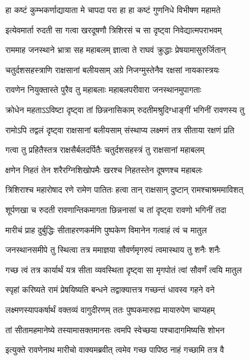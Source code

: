 \twolineshloka
{हा कष्टं कुम्भकर्णाद्यायाता मे चापदा परा}
{हा हा कष्टं गुणनिधे विभीषण महामते} %

\twolineshloka
{इत्येवमार्ता रुदती सा गत्वा खरदूषणौ}
{त्रिशिरसं च सा दृष्ट्वा निवेद्यात्मपराभवम्} %

\twolineshloka
{राममाह जनस्थाने भ्रात्रा सह महाबलम्}
{ज्ञात्वा ते राघवं क्रुद्धाः प्रेषयामासुरुर्जितान्} %

\twolineshloka
{चतुर्दशसहस्त्राणि राक्षसानां बलीयसाम्}
{अग्रे निजग्मुस्तेनैव रक्षसां नायकास्त्रयः} %

\twolineshloka
{रावणेन नियुक्तास्ते पुरैव तु महाबलाः}
{महाबलपरीवारा जनस्थानमुपागताः} %

\twolineshloka
{क्रोधेन महताऽऽविष्टा दृष्ट्वा तां छिन्ननासिकाम्}
{रुदतीमश्रुदिग्धाङ्गीं भगिनीं रावणस्य तु} %

\twolineshloka
{रामोऽपि तद्वलं दृष्ट्वा राक्षसानां बलीयसाम्}
{संस्थाप्य लक्ष्मणं तत्र सीताया रक्षणं प्रति} %

\twolineshloka
{गत्वा तु प्रहितैस्तत्र राक्षसैर्बलदर्पितैः}
{चतुर्दशसहस्त्रं तु राक्षसानां महाबलम्} %

\twolineshloka
{क्षणेन निहतं तेन शरैरग्निशिखोपमैः}
{खरश्च निहतस्तेन दूषणश्च महाबलः} %

\twolineshloka
{त्रिशिराश्च महारोषाद रणे रामेण पातितः}
{हत्वा तान् राक्षसान् दुष्टान् रामश्चाश्रममाविशत्} %

\twolineshloka
{शूर्पणखा च रुदती रावणान्तिकमागता}
{छिन्ननासां च तां दृष्ट्वा रावणो भगिनीं तदा} %

\twolineshloka
{मारीचं प्राह दुर्बुद्धिः सीताहरणकर्मणि}
{पुष्पकेण विमानेन गत्वाहं त्वं च मातुल} %

\twolineshloka
{जनस्थानसमीपे तु स्थित्वा तत्र ममाज्ञया}
{सौवर्णमृगरुपं त्वमास्थाय तु शनैः शनैः} %

\twolineshloka
{गच्छ त्वं तत्र कार्यार्थं यत्र सीता व्यवस्थिता}
{दृष्ट्वा सा मृगपोतं त्वां सौवर्णं त्वयि मातुल} %

\twolineshloka
{स्पृहां करिष्यते रामं प्रेषयिष्यति बन्धने}
{तद्वाक्यात्तत्र गच्छन्तं धावस्व गहने वने} %

\twolineshloka
{लक्ष्मणस्यापकर्षार्थं वक्तव्यं वागुदीरणम्}
{ततः पुष्पकमारुह्य मायारुपेण चाप्यहम्} %

\twolineshloka
{तां सीतामहमानेष्ये तस्यामासक्तमानसः}
{त्वमपि स्वेच्छया पश्चादागमिष्यसि शोभन} %

\twolineshloka
{इत्युक्ते रावणेनाथ मारीचो वाक्यमब्रवीत्}
{त्वमेव गच्छ पापिष्ठ नाहं गच्छामि तत्र वै} %

